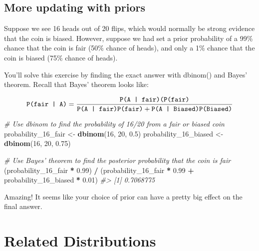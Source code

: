 \documentclass[]{article}
\newenvironment{Shaded}{\begin{snugshade}}{\end{snugshade}}
\newcommand{\CommentTok}[1]{\textcolor[rgb]{0.56,0.35,0.01}{\textit{#1}}}
\newcommand{\DecValTok}[1]{\textcolor[rgb]{0.00,0.00,0.81}{#1}}
\newcommand{\FloatTok}[1]{\textcolor[rgb]{0.00,0.00,0.81}{#1}}
\newcommand{\KeywordTok}[1]{\textcolor[rgb]{0.13,0.29,0.53}{\textbf{#1}}}
\newcommand{\NormalTok}[1]{#1}
\newcommand{\OperatorTok}[1]{\textcolor[rgb]{0.81,0.36,0.00}{\textbf{#1}}}
\newcommand{\StringTok}[1]{\textcolor[rgb]{0.31,0.60,0.02}{#1}}
\begin{document}
\hypertarget{more-updating-with-priors}{%
\subsection{More updating with priors}\label{more-updating-with-priors}}

Suppose we see 16 heads out of 20 flips, which would normally be strong
evidence that the coin is biased. However, suppose we had set a prior
probability of a 99\% chance that the coin is fair (50\% chance of
heads), and only a 1\% chance that the coin is biased (75\% chance of
heads).

You'll solve this exercise by finding the exact answer with dbinom() and
Bayes' theorem. Recall that Bayes' theorem looks like:

\[\texttt{P(fair | A)} \\ = 
\frac{\texttt{P(A | fair)(P(fair)}}{\texttt{P(A | fair)P(fair)} + \texttt{P(A | Biased)P(Biased)}}\]

\begin{Shaded}
\begin{Highlighting}[]
\CommentTok{# Use dbinom to find the probability of 16/20 from a fair or biased coin}
\NormalTok{probability_}\DecValTok{16}\NormalTok{_fair <-}\StringTok{ }\KeywordTok{dbinom}\NormalTok{(}\DecValTok{16}\NormalTok{, }\DecValTok{20}\NormalTok{, }\FloatTok{0.5}\NormalTok{) }
\NormalTok{probability_}\DecValTok{16}\NormalTok{_biased <-}\StringTok{ }\KeywordTok{dbinom}\NormalTok{(}\DecValTok{16}\NormalTok{, }\DecValTok{20}\NormalTok{, }\FloatTok{0.75}\NormalTok{) }

\CommentTok{# Use Bayes' theorem to find the posterior probability that the coin is fair}
\NormalTok{(probability_}\DecValTok{16}\NormalTok{_fair }\OperatorTok{*}\StringTok{ }\FloatTok{0.99}\NormalTok{) }\OperatorTok{/}\StringTok{ }\NormalTok{(probability_}\DecValTok{16}\NormalTok{_fair }\OperatorTok{*}\StringTok{ }\FloatTok{0.99} \OperatorTok{+}\StringTok{ }\NormalTok{probability_}\DecValTok{16}\NormalTok{_biased }\OperatorTok{*}\StringTok{ }\FloatTok{0.01}\NormalTok{)}
\CommentTok{#> [1] 0.7068775}
\end{Highlighting}
\end{Shaded}

Amazing! It seems like your choice of prior can have a pretty big effect
on the final answer.

\hypertarget{related-distributions}{%
\section{Related Distributions}\label{related-distributions}}
\end{document}
